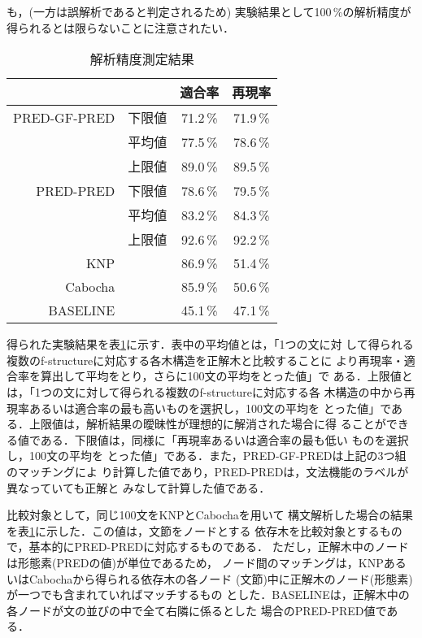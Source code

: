 も，(一方は誤解析であると判定されるため) 実験結果として100\,\%の解析精度が
得られるとは限らないことに注意されたい．\\
\tabcolsep 5mm
\begin{table}[htbp]
\caption{解析精度測定結果}
\begin{center}
\begin{footnotesize}
\begin{tabular}{rccc}
\hline
&&適合率&再現率\\
\hline
PRED-GF-PRED&下限値&71.2\,\%&71.9\,\%\\
&平均値&77.5\,\%&78.6\,\%\\
&上限値&89.0\,\%&89.5\,\%\\
PRED-PRED&下限値&78.6\,\%&79.5\,\%\\
&平均値&83.2\,\%&84.3\,\%\\
&上限値&92.6\,\%&92.2\,\%\\
\hline
KNP&&86.9\,\%&51.4\,\%\\
\hline
Cabocha&&85.9\,\%&50.6\,\%\\
\hline
BASELINE&&45.1\,\%&47.1\,\%\\
\hline
\end{tabular}
\end{footnotesize}
\vspace{2mm}
\label{table4}
\end{center}
\end{table}


\normalsize
得られた実験結果を表\ref{table4}に示す．表中の平均値とは，「1つの文に対
して得られる複数のf-structureに対応する各木構造を正解木と比較することに
より再現率・適合率を算出して平均をとり，さらに100文の平均をとった値」で
ある．上限値とは，「1つの文に対して得られる複数のf-structureに対応する各
木構造の中から再現率あるいは適合率の最も高いものを選択し，100文の平均を
とった値」である．上限値は，解析結果の曖昧性が理想的に解消された場合に得
ることができる値である．下限値は，同様に「再現率あるいは適合率の最も低い
ものを選択し，100文の平均を
とった値」である．また，PRED-GF-PREDは上記の3つ組のマッチングによ
り計算した値であり，PRED-PREDは，文法機能のラベルが異なっていても正解と
みなして計算した値である． 

比較対象として，同じ100文をKNP\cite{knp}とCabocha\cite{cabocha}を用いて
構文解析した場合の結果を表\ref{table4}に示した．この値は，文節をノードとする
依存木を比較対象とするもので，基本的にPRED-PREDに対応するものである．
ただし，正解木中のノードは形態素(PREDの値)が単位であるため，
ノード間のマッチングは，KNPあるいはCabochaから得られる依存木の各ノード
(文節)中に正解木のノード(形態素)が一つでも含まれていればマッチするもの
とした．BASELINEは，正解木中の各ノードが文の並びの中で全て右隣に係るとした
場合のPRED-PRED値である．
